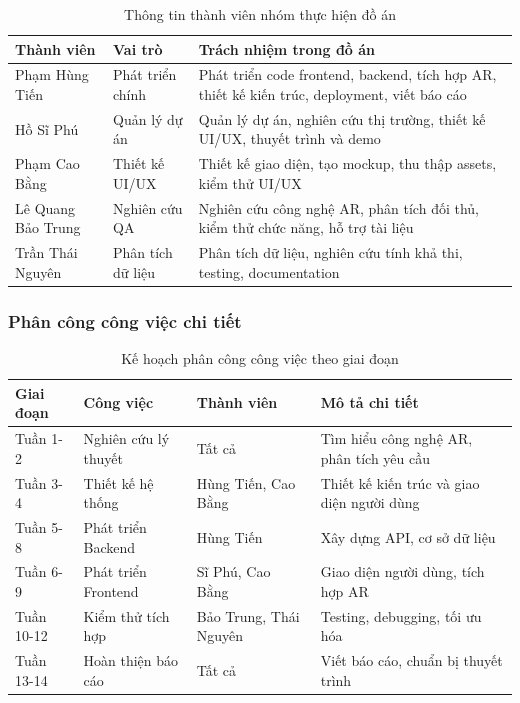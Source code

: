 \documentclass[12pt,a4paper]{article}
\begin{document}
\begin{table}[H]
\centering
\caption{Thông tin thành viên nhóm thực hiện đồ án}
\label{tab:team-members}
\begin{tabular}{@{}>{\raggedright\arraybackslash}p{3cm}>{\raggedright\arraybackslash}p{3cm}>{\raggedright\arraybackslash}p{6cm}@{}}
\toprule
\textbf{Thành viên} & \textbf{Vai trò} & \textbf{Trách nhiệm trong đồ án} \\
\midrule
Phạm Hùng Tiến & Phát triển chính & Phát triển code frontend, backend, tích hợp AR, thiết kế kiến trúc, deployment, viết báo cáo \\
Hồ Sĩ Phú & Quản lý dự án & Quản lý dự án, nghiên cứu thị trường, thiết kế UI/UX, thuyết trình và demo \\
Phạm Cao Bằng & Thiết kế UI/UX & Thiết kế giao diện, tạo mockup, thu thập assets, kiểm thử UI/UX \\
Lê Quang Bảo Trung & Nghiên cứu QA & Nghiên cứu công nghệ AR, phân tích đối thủ, kiểm thử chức năng, hỗ trợ tài liệu \\
Trần Thái Nguyên & Phân tích dữ liệu & Phân tích dữ liệu, nghiên cứu tính khả thi, testing, documentation \\
\bottomrule
\end{tabular}
\end{table}

\subsubsection{Phân công công việc chi tiết}

\begin{table}[H]
\centering
\caption{Kế hoạch phân công công việc theo giai đoạn}
\label{tab:work-allocation}
\begin{tabular}{@{}>{\raggedright\arraybackslash}p{2cm}>{\raggedright\arraybackslash}p{3cm}>{\raggedright\arraybackslash}p{2cm}>{\raggedright\arraybackslash}p{5cm}@{}}
\toprule
\textbf{Giai đoạn} & \textbf{Công việc} & \textbf{Thành viên} & \textbf{Mô tả chi tiết} \\
\midrule
Tuần 1-2 & Nghiên cứu lý thuyết & Tất cả & Tìm hiểu công nghệ AR, phân tích yêu cầu \\
Tuần 3-4 & Thiết kế hệ thống & Hùng Tiến, Cao Bằng & Thiết kế kiến trúc và giao diện người dùng \\
Tuần 5-8 & Phát triển Backend & Hùng Tiến & Xây dựng API, cơ sở dữ liệu \\
Tuần 6-9 & Phát triển Frontend & Sĩ Phú, Cao Bằng & Giao diện người dùng, tích hợp AR \\
Tuần 10-12 & Kiểm thử tích hợp & Bảo Trung, Thái Nguyên & Testing, debugging, tối ưu hóa \\
Tuần 13-14 & Hoàn thiện báo cáo & Tất cả & Viết báo cáo, chuẩn bị thuyết trình \\
\bottomrule
\end{tabular}
\end{table}
\end{document}
